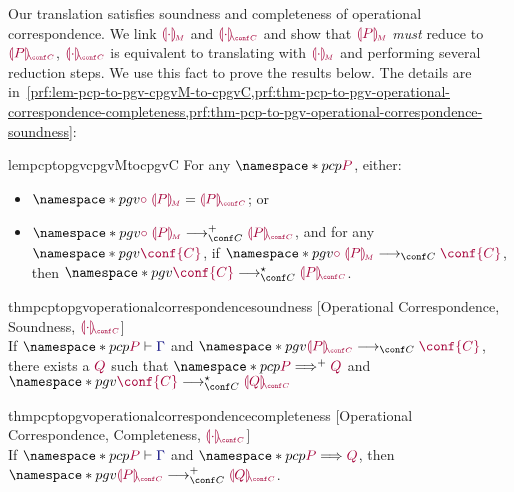 \documentclass[main.tex]{subfiles}
\begin{document}
Our translation satisfies soundness and completeness of operational correspondence. We link ${\tm{\cpgvM{\cdot}}}$ and ${\tm{\cpgvC{\cdot}}}$ and show that $\tm{\cpgvM{P}}$ \emph{must} reduce to $\tm{\cpgvC{P}}$, \ie $\tm{\cpgvC{\cdot}}$ is equivalent to translating with $\tm{\cpgvM{\cdot}}$ and performing several reduction steps. We use this fact to prove the results below. The details are in~\cref{prf:lem-pcp-to-pgv-cpgvM-to-cpgvC,prf:thm-pcp-to-pgv-operational-correspondence-completeness,prf:thm-pcp-to-pgv-operational-correspondence-soundness}:
  \begin{restatablelemma}{lempcptopgvcpgvMtocpgvC}
    \label{lem:pcp-to-pgv-cpgvM-to-cpgvC}
    For any $\pcp{\tm{P}}$, either:
    \begin{itemize}
    \item $\pgv{\tm{\child\;\cpgvM{P}}=\tm{\cpgvC{P}}}$; or
    \item   $\pgv{\tm{\child\;\cpgvM{P}}\cred^+\tm{\cpgvC{P}}}$, and for any $\pgv{\tm{\conf{C}}}$, if $\pgv{\tm{\child\;\cpgvM{P}}\cred\tm{\conf{C}}}$, then $\pgv{\tm{\conf{C}}\cred^\star\tm{\cpgvC{P}}}$.
    \end{itemize}
  \end{restatablelemma}
  \begin{restatabletheorem}{thmpcptopgvoperationalcorrespondencesoundness}%
    [Operational Correspondence, Soundness, ${\tm{\cpgvC{\cdot}}}$]
    \label{thm:pcp-to-pgv-operational-correspondence-soundness}
    \hfill\\%
    If $\pcp{\seq{P}{\ty{\Gamma}}}$ and $\pgv{\tm{\cpgvC{P}}\cred\tm{\conf{C}}}$, there exists a $\tm{Q}$ such that $\pcp{\tm{P}\red^+\tm{Q}}$ and $\pgv{\tm{\conf{C}}\cred^\star\tm{\cpgvC{Q}}}$
  \end{restatabletheorem}
\begin{restatabletheorem}{thmpcptopgvoperationalcorrespondencecompleteness}%
  [Operational Correspondence, Completeness, ${\tm{\cpgvC{\cdot}}}$]
  \label{thm:pcp-to-pgv-operational-correspondence-completeness}
  \hfill\\%
  If $\pcp{\seq{P}{\ty{\Gamma}}}$ and $\pcp{\tm{P}\red\tm{Q}}$,
  then $\pgv{\tm{\cpgvC{P}}\cred^+\tm{\cpgvC{Q}}}$.
\end{restatabletheorem}
\end{document}
